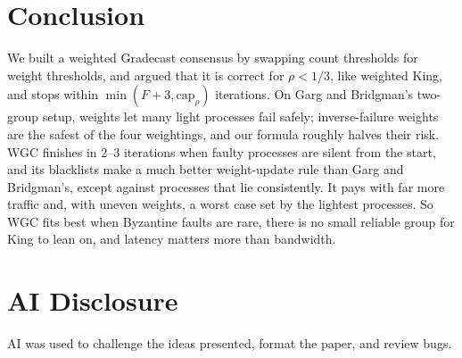 \documentclass[conference]{IEEEtran}
\theoremstyle{definition}
\newcommand{\capr}{\mathrm{cap}_\rho}
\begin{document}
\section{Conclusion}\label{sec:concl}

We built a weighted Gradecast consensus by swapping count thresholds for weight thresholds, and argued that it is correct for $\rho<1/3$, like weighted King, and stops within $\min(F+3,\capr)$ iterations. On Garg and Bridgman's two-group setup, weights let many light processes fail safely; inverse-failure weights are the safest of the four weightings, and our formula roughly halves their risk. WGC finishes in 2--3 iterations when faulty processes are silent from the start, and its blacklists make a much better weight-update rule than Garg and Bridgman's, except against processes that lie consistently. It pays with far more traffic and, with uneven weights, a worst case set by the lightest processes. So WGC fits best when Byzantine faults are rare, there is no small reliable group for King to lean on, and latency matters more than bandwidth.



\section{AI Disclosure}
AI was used to challenge the ideas presented, format the paper, and review bugs.
\end{document}
